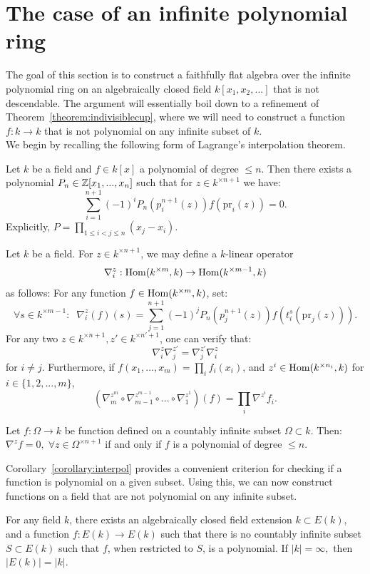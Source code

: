 \section{The case of an infinite polynomial ring}
The goal of this section is to construct a faithfully flat 
algebra over the infinite polynomial ring on an algebraically closed field $k[x_1,x_2,...]$ that is not descendable. The argument
will essentially boil down to a refinement of Theorem~\ref{theorem:indivisiblecup}, 
where we will need to construct a function $f:k \to k$ that is not polynomial on any infinite subset of $k$.\\
\indent We begin by recalling the following form of Lagrange's interpolation theorem.
\begin{theorem}
Let $k$ be a field and $f \in k[x]$ a polynomial of degree $\le n$. Then there exists a polynomial $P_n \in \mathbb{Z}[x_1,...,x_n]$ such that for $z \in k^{\times n+1}$ we have:
\[\sum_{i=1}^{n+1} (-1)^iP_n(p^{n+1}_i(z))f(\text{pr}_i(z)) = 0.\]
Explicitly, $P = \prod_{ 1 \le i < j \le n} (x_j - x_i)$.
\end{theorem}
\begin{definition}
Let $k$ be a field. For $z \in k^{\times n+1}$, we may define a $k$-linear operator 
\[\nabla^z_i: \operatorname{Hom}(k^{\times m}, k) \rightarrow \operatorname{Hom}(k^{\times m-1},k)\]
as follows: For any function $f \in  \operatorname{Hom}(k^{\times m}, k)$, set:
\[\forall s \in k^{\times m-1}: \; \;  \nabla^{z}_i(f)(s) = \sum_{j=1}^{n+1} (-1)^j P_n(p^{n+1}_j(z)) f(t^{s}_i(\text{pr}_j(z))).\]
For any two $z \in k^{\times n+1}, z' \in k^{\times n'+1}$, one can verify that:
\[\nabla^z_i \nabla^{z'}_j = \nabla^{z'}_j \nabla^{z}_i\]
for $i \neq j$. Furthermore, if $f(x_1,...,x_m) = \prod_i f_i(x_i)$, and $z^i \in \operatorname{Hom}(k^{\times n_i}, k)$ for $i\in \{1,2,...,m\}$, 
\[(\nabla^{z^m}_m \circ \nabla^{z^{m-1}}_{m-1} \circ ... \circ \nabla^{z^1}_{1})(f) = \prod_i \nabla^{z^i} f_i.\]
\end{definition}
\begin{corollary}\label{corollary:interpol}
Let $f: \Omega \to k$ be function defined on a countably infinite subset $\Omega \subset k$. 
Then: $\nabla^{z} f = 0,\;  \forall z \in \Omega^{\times n+1}$ if and only if $f$ is a polynomial of degree $\le n$.
\end{corollary}
Corollary~\ref{corollary:interpol} provides a convenient criterion for checking if a function is polynomial on a given subset.
Using this, we can now construct functions on a field that are not polynomial on any infinite subset.
\begin{proposition}\label{proposition:notpoly}
For any field $k$, there exists an algebraically closed field extension $k \subset E(k)$, and a function $f: E(k) \to E(k)$ 
such that there is no countably infinite subset $S \subset E(k)$ such that $f$, when restricted to $S$, is a polynomial. 
If $|k| = \infty,$ then $|E(k)| = |k|$.
\end{proposition}
